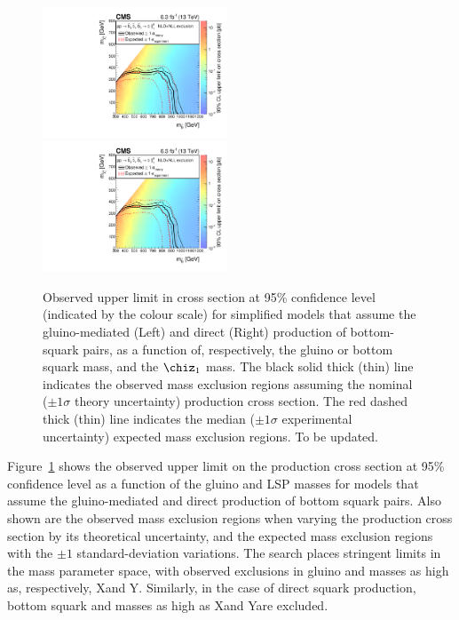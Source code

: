 \begin{figure}[thp!]
  \begin{center}
    \includegraphics[width=0.49\textwidth]{T2bb.pdf} ~
    \includegraphics[width=0.49\textwidth]{T2bb.pdf} \\
    \caption{Observed upper limit in cross section at 95\% confidence
      level (indicated by the colour scale) for simplified models that
      assume the gluino-mediated (Left) and direct (Right) production
      of bottom-squark pairs, as a function of, respectively, the
      gluino or bottom squark mass, and the $\chiz_{1}$ mass. The
      black solid thick (thin) line indicates the observed mass
      exclusion regions assuming the nominal (${\pm}1 \sigma$ theory
      uncertainty) production cross section. The red dashed thick
      (thin) line indicates the median (${\pm}1 \sigma$ experimental
      uncertainty) expected mass exclusion regions. {\color{red} To be
        updated. } }
      \label{fig:limits-sms} 
  \end{center}
\end{figure}

Figure~\ref{fig:limits-sms} shows the observed upper limit on the
production cross section at 95\% confidence level as a function of the
gluino and LSP masses for models that assume the gluino-mediated and
direct production of bottom squark pairs. Also shown are the observed
mass exclusion regions when varying the production cross section by
its theoretical uncertainty, and the expected mass exclusion regions
with the ${\pm}1$ standard-deviation variations. The search places
stringent limits in the mass parameter space, with observed exclusions
in gluino and \chiz masses as high as, respectively, X\gev and
Y\gev. Similarly, in the case of direct squark production, bottom
squark and \chiz masses as high as X\gev and Y\gev are excluded.

